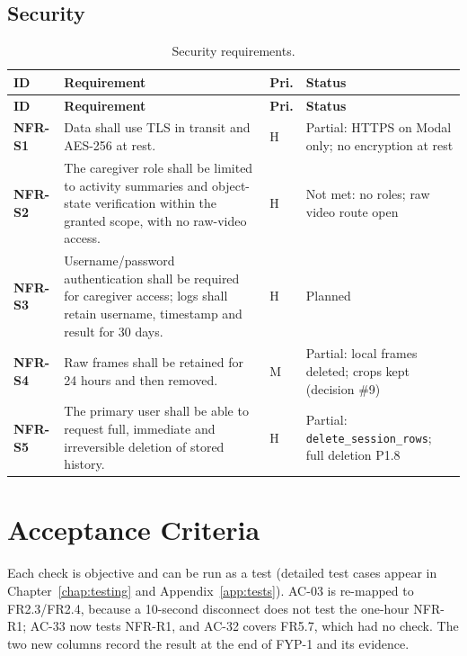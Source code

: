 \subsection{Security}
\begin{ltab}
\begin{longtable}{@{}>{\bfseries}L{1.6cm}L{8.6cm}L{0.7cm}L{3.8cm}@{}}
\caption{Security requirements.}\\
\toprule
{}\textbf{ID} & \textbf{Requirement} & \textbf{Pri.} & \textbf{Status}\\
\midrule
\endfirsthead
\toprule
{}\textbf{ID} & \textbf{Requirement} & \textbf{Pri.} & \textbf{Status}\\
\midrule
\endhead
\bottomrule
\endfoot
NFR-S1 & Data shall use TLS in transit and AES-256 at rest. & H & Partial: HTTPS on Modal only; no encryption at rest\\
NFR-S2 & The caregiver role shall be limited to activity summaries and object-state verification within the granted scope, with no raw-video access. & H & Not met: no roles; raw video route open\\
NFR-S3 & Username/password authentication shall be required for caregiver access; logs shall retain username, timestamp and result for 30 days. & H & Planned\\
NFR-S4 & Raw frames shall be retained for 24 hours and then removed.
 & M & Partial: local frames deleted; crops kept (decision \#9)\\
NFR-S5 & The primary user shall be able to request full, immediate and irreversible deletion of stored history. & H & Partial: \texttt{delete\_session\_rows}; full deletion P1.8\\
\end{longtable}
\end{ltab}

\clearpage
\section{Acceptance Criteria}
\label{sec:ac}
Each check is objective and can be run as a test (detailed test cases appear in
Chapter~\ref{chap:testing} and Appendix~\ref{app:tests}). AC-03 is re-mapped to
FR2.3/FR2.4, because a 10-second disconnect does not test the one-hour NFR-R1;
AC-33 now tests NFR-R1, and AC-32 covers FR5.7, which had no check. The two new
columns record the result at the end of FYP-1 and its evidence.

